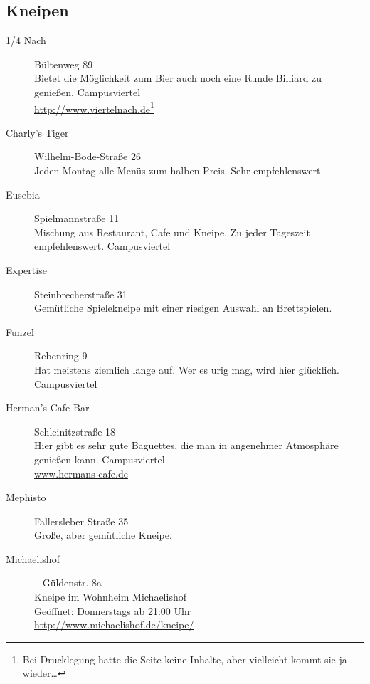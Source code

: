 \begin{multicols}{2}
\subsection{Kneipen}
	\begin{description}
		\item[1/4 Nach] \hfill Bültenweg 89\\
		Bietet die Möglichkeit zum Bier auch noch eine Runde Billiard zu genießen.
		Campusviertel\\
		\url{http://www.viertelnach.de}\footnote{Bei Drucklegung hatte die Seite keine Inhalte, aber vielleicht kommt sie ja wieder\ldots}

		\item[Charly's Tiger] \hfill Wilhelm-Bode-Straße 26\\
		Jeden Montag alle Menüs zum halben Preis. Sehr empfehlenswert.


		\item[Eusebia] \hfill Spielmannstraße 11\\
		Mischung aus Restaurant, Cafe und Kneipe. Zu jeder Tageszeit empfehlenswert.
		Campusviertel

		\item[Expertise] \hfill Steinbrecherstraße 31\\
		Gemütliche Spielekneipe mit einer riesigen Auswahl an Brettspielen.

		\item[Funzel] \hfill Rebenring 9\\
		Hat meistens ziemlich lange auf. Wer es urig mag, wird hier glücklich. \\
		Campusviertel

		\item[Herman's Cafe Bar] \hfill Schleinitzstraße 18\\
		Hier gibt es sehr gute Baguettes, die man in angenehmer Atmosphäre genießen kann.
		Campusviertel\\
		\url{www.hermans-cafe.de}

		\item[Mephisto] \hfill Fallersleber Straße 35\\
		Große, aber gemütliche Kneipe.

		\item[Michaelishof]~ \hfill Güldenstr. 8a\\
		Kneipe im Wohnheim Michaelishof\\
		Geöffnet: Donnerstags ab 21:00 Uhr\\
		\url{http://www.michaelishof.de/kneipe/}


\end{description}
\end{multicols}
